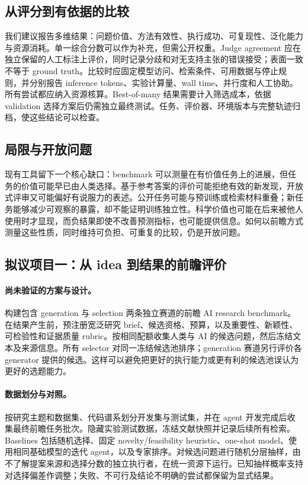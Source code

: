 \subsection{从评分到有依据的比较}

我们建议报告多维结果：问题价值、方法有效性、执行成功、可复现性、泛化能力与资源消耗。单一综合分数可以作为补充，但需公开权重。Judge agreement 应在独立保留的人工标注上评价，同时记录分歧和对无支持主张的错误接受；表面一致不等于 ground truth。比较时应固定模型访问、检索条件、可用数据与停止规则，并分别报告 inference tokens、实验计算量、wall time、并行度和人工协助。所有尝试都应纳入资源核算。Best-of-many 结果需要计入筛选成本，依据 validation 选择方案后仍需独立最终测试。任务、评价器、环境版本与完整轨迹归档，使这些结论可以检查。

\subsection{局限与开放问题}

现有工具留下一个核心缺口：benchmark 可以测量在有价值任务上的进展，但任务的价值可能早已由人类选择。基于参考答案的评价可能拒绝有效的新发现，开放式评审又可能偏好有说服力的表述。公开任务可能与预训练或检索材料重叠；新任务能够减少可观察的暴露，却不能证明训练独立性。科学价值也可能在后来被他人使用时才显现，而负结果即使不改善预测指标，也可能提供信息。如何以前瞻方式测量这些性质，同时维持可负担、可重复的比较，仍是开放问题。

\subsection{拟议项目一：从 idea 到结果的前瞻评价}

\paragraph{尚未验证的方案与设计。}
构建包含 generation 与 selection 两条独立赛道的前瞻 AI research benchmark。在结果产生前，预注册宽泛研究 brief、候选资格、预算，以及重要性、新颖性、可检验性和证据质量 rubric。按相同配额收集人类与 AI 的候选问题，然后冻结文本及来源信息。所有 selector 对同一冻结候选池排序；generation 赛道另行评价各 generator 提供的候选。这样可以避免把更好的执行能力或更有利的候选池误认为更好的选题能力。

\paragraph{数据划分与对照。}
按研究主题和数据集、代码谱系划分开发集与测试集，并在 agent 开发完成后收集最终前瞻任务批次。隐藏实验测试数据，冻结文献快照并记录后续所有检索。Baselines 包括随机选择、固定 novelty/feasibility heuristic、one-shot model、使用相同基础模型的迭代 agent，以及专家排序。对候选问题进行随机分层抽样，由不了解提案来源和选择分数的独立执行者，在统一资源下运行。已知抽样概率支持对选择偏差作调整；失败、不可行及结论不明确的尝试都保留为显式结果。

